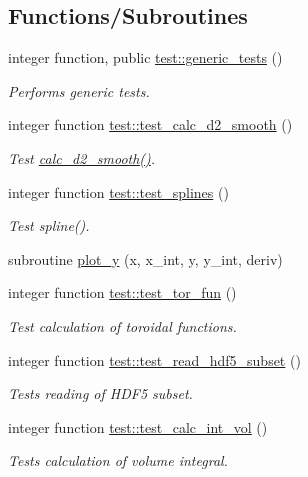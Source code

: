 \subsection*{Functions/\+Subroutines}
\begin{DoxyCompactItemize}
\item 
integer function, public \hyperlink{namespacetest_aca21ee464c0b1f4b617177afdde110ec}{test\+::generic\+\_\+tests} ()
\begin{DoxyCompactList}\small\item\em Performs generic tests. \end{DoxyCompactList}\item 
integer function \hyperlink{namespacetest_a1c04fcea513c8c2efb189049d810318a}{test\+::test\+\_\+calc\+\_\+d2\+\_\+smooth} ()
\begin{DoxyCompactList}\small\item\em Test \hyperlink{namespacenum__utilities_ab4c91a6478c4dd6f519f8ccbccc4094f}{calc\+\_\+d2\+\_\+smooth()}. \end{DoxyCompactList}\item 
integer function \hyperlink{namespacetest_a53c6b3d654d4577af301fe3b04473d6a}{test\+::test\+\_\+splines} ()
\begin{DoxyCompactList}\small\item\em Test spline(). \end{DoxyCompactList}\item 
subroutine \hyperlink{test_8f90_a197914f99b7e194fb4bca9ca3669e0e8}{plot\+\_\+y} (x, x\+\_\+int, y, y\+\_\+int, deriv)
\item 
integer function \hyperlink{namespacetest_ab595ec935321ea0b1168593fb88fad22}{test\+::test\+\_\+tor\+\_\+fun} ()
\begin{DoxyCompactList}\small\item\em Test calculation of toroidal functions. \end{DoxyCompactList}\item 
integer function \hyperlink{namespacetest_ac574f08ba400cd61070a6a6f13f6f7ee}{test\+::test\+\_\+read\+\_\+hdf5\+\_\+subset} ()
\begin{DoxyCompactList}\small\item\em Tests reading of H\+D\+F5 subset. \end{DoxyCompactList}\item 
integer function \hyperlink{namespacetest_a0d4cb791bf762b2e52260fea7644a3ee}{test\+::test\+\_\+calc\+\_\+int\+\_\+vol} ()
\begin{DoxyCompactList}\small\item\em Tests calculation of volume integral. \end{DoxyCompactList}\end{DoxyCompactItemize}


